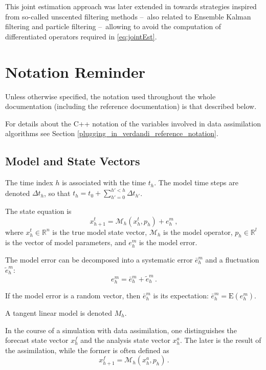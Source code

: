 \documentclass{tufte-book}
\begin{document}
This joint estimation approach was later extended in \cite{PM-DC-10} towards strategies inspired from so-called unscented filtering methods --~also related to Ensemble Kalman filtering and particle filtering --~allowing to avoid the computation of differentiated operators required in \eqref{eq:jointEst}.



\hypertarget{mathematical_hotation}{}\section{Notation Reminder}\label{mathematical_notation}

\-Unless otherwise specified, the notation used throughout the whole documentation (including the reference documentation) is that described below.

\-For details about the \-C++ notation of the variables involved in data assimilation algorithms see Section \ref{plugging_in_verdandi_reference_notation}.


\hypertarget{notation_model}{}\subsection{\-Model and State Vectors}\label{notation_model}

\-The time index $h$ is associated with the time $t_h$. \-The model time steps are denoted $\Delta t_h$, so that $t_h = t_0 + \sum_{h' = 0}^{h' < h} \Delta t_{h'}$.

\-The state equation is \[x^t_{h+1} = \mathcal{M}_h(x^t_h, p_h) + e^m_h\,,\] where $x^t_h \in \mathbb{R}^n$ is the true model state vector, $\mathcal{M}_h$ is the model operator, $p_h \in \mathbb{R}^l$ is the vector of model parameters, and $e^m_h$ is the model error. \par


\-The model error can be decomposed into a systematic error $\bar e^m_h$ and a fluctuation $\tilde e^m_h$\-: \[e^m_h = \bar e^m_h + \tilde e^m_h\,.\]

\-If the model error is a random vector, then $\bar e^m_h$ is its expectation\-: $\bar e^m_h = \mathrm{E}(e^m_h)$.

\-A tangent linear model is denoted $M_h$.

\-In the course of a simulation with data assimilation, one distinguishes the forecast state vector $x^f_h$ and the analysis state vector $x^a_h$. \-The later is the result of the assimilation, while the former is often defined as \[x^f_{h+1} = \mathcal{M}_h(x^a_h, p_h)\,.\]
\end{document}
